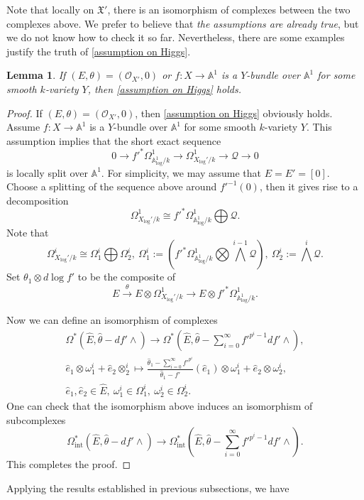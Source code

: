 \documentclass[12pt, a4paper]{article}
\newtheorem{lemma}{Lemma}[section]
\begin{document}
Note that locally on $\mathfrak X'$, there is an isomorphism of complexes between the two complexes above. We prefer to believe that {\itshape the assumptions are already true}, but we do not know how to check it so far. Nevertheless, there are some examples justify the truth of \eqref{assumption on Higgs}.
\begin{lemma}
If $(E,\theta)=(\mathcal O_{X'},0)$ or $f:X\to\mathbb A^1$ is a $Y$-bundle over $\mathbb A^1$ for some smooth $k$-variety $Y$, then \eqref{assumption on Higgs} holds.
\end{lemma}
\begin{proof}
If $(E,\theta)=(\mathcal O_{X'},0)$, then  \eqref{assumption on Higgs} obviously holds. Assume $f:X\to\mathbb A^1$ is a $Y$-bundle over $\mathbb A^1$ for some smooth $k$-variety $Y$. This assumption implies that the short exact sequence
$$
0\to f'^*\Omega^1_{\mathbb A_{\log}^1/k}\to\Omega^1_{X_{\log}'/k}\to\mathcal Q\to0
$$
is locally split over $\mathbb A^1$. For simplicity, we may assume that $E=E'=[0]$. Choose a splitting of the sequence above around $f'^{-1}(0)$, then it gives rise to a decomposition
$$
\Omega^1_{X_{\log}'/k}\cong f'^*\Omega^1_{\mathbb A_{\log}^1/k}\bigoplus\mathcal Q.
$$
Note that
$$
\Omega^i_{X_{\log}'/k}\cong\Omega^i_1\bigoplus\Omega^i_2,~\Omega^i_1:=(f'^*\Omega^1_{\mathbb A_{\log}^1/k}\bigotimes\bigwedge^{i-1}\mathcal Q),~\Omega^i_2:=\bigwedge^i\mathcal Q.
$$
Set $\theta_1\otimes d\log f'$ to be the composite of
$$
E\stackrel{\theta}{\rightarrow}E\otimes\Omega^1_{X_{\log}'/k}\to E\otimes f'^*\Omega^1_{\mathbb A_{\log}^1/k}.
$$

Now we can define an isomorphism of complexes
$$
\begin{array}{c}
\Omega^*(\hat E,\hat\theta-df'\wedge)\longrightarrow\Omega^*(\hat E,\hat\theta-\sum_{i=0}^\infty f'^{p^i-1}df'\wedge),\\
\hat e_1\otimes\omega^i_1+\hat e_2\otimes^i_2\mapsto\frac{\hat\theta_1-\sum_{i=0}^\infty f'^{p^i}}{\hat\theta_1-f'}(\hat e_1)\otimes\omega^i_1+\hat e_2\otimes\omega^i_2,\\
\hat e_1,\hat e_2\in\hat E,~\omega^i_1\in\Omega^i_1,~\omega^i_2\in\Omega^i_2.
\end{array}
$$
One can check that the isomorphism above induces an isomorphism of subcomplexes
$$
\Omega_\mathrm{int}^*(\hat E,\hat\theta-df'\wedge)\longrightarrow\Omega_\mathrm{int}^*(\hat E,\hat\theta-\sum_{i=0}^\infty f'^{p^i-1}df'\wedge).
$$
This completes the proof.
\end{proof}
\fi
Applying the results established in previous subsections,  we have
\end{document}
